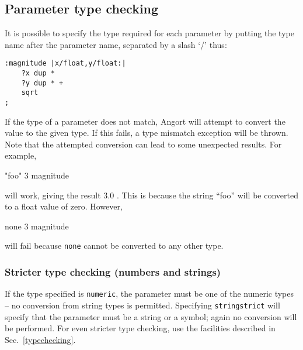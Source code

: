 \subsection{Parameter type checking}
It is possible to specify the type required for each parameter by putting the type name
after the parameter name, separated by a slash `/' thus:
\begin{lstlisting}
:magnitude |x/float,y/float:|
    ?x dup *
    ?y dup * +
    sqrt
;
\end{lstlisting}
If the type of a parameter does not match, Angort will attempt to convert the 
value to the given type. If this fails, a type mismatch exception will be thrown.
Note that the attempted conversion can lead to some unexpected results. For example,
\begin{v}
"foo" 3 magnitude
\end{v}
will work, giving the result 3.0 . This is because the string ``foo'' will be converted
to a float value of zero. However,
\begin{v}
none 3 magnitude
\end{v}
will fail because \texttt{none} cannot be converted to any other type.

\subsubsection{Stricter type checking (numbers and strings)}
If the type specified is \texttt{numeric}, the parameter
must be one of the numeric types -- no conversion from string types
is permitted. Specifying \texttt{stringstrict} will specify
that the parameter must be a string or a symbol; again no conversion
will be performed.
For even stricter type checking, use the facilities described in
Sec.~\ref{typechecking}.

